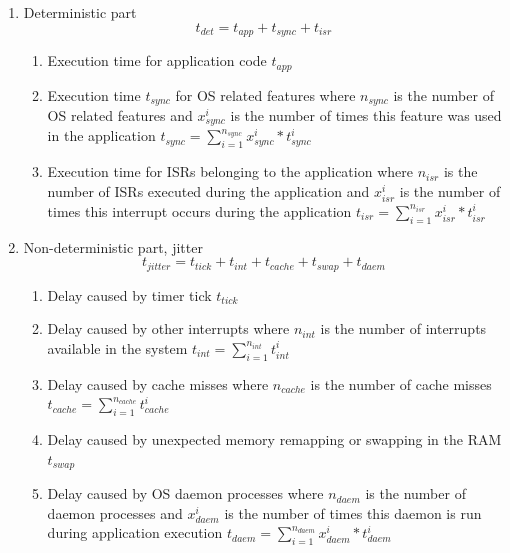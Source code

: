 \begin{enumerate}
	\item Deterministic part 
	\begin{equation}
			t_{det} = t_{app} + t_{sync} + t_{isr}
		\label{eq_det_app}
	\end{equation}  		
		\begin{enumerate}
			\item Execution time for application code $ t_{app} $ 
			\item Execution time $ t_{sync} $ for \ac{OS} related features where $ n_{sync} $ is the number of \ac{OS} related features and $ x_{sync}^{i} $ is the number of times this feature was used in the application 
						$ t_{sync} = \sum\limits_{i=1}^{n_{sync}} {x_{sync}^{i} * t_{sync}^{i}} $
			\item Execution time for \acp{ISR} belonging to the application where $ n_{isr} $ is the number of 
						\acp{ISR} executed during the application and $ x_{isr}^{i} $ is the number of times this interrupt
						occurs during the application
						$ t_{isr} = \sum\limits_{i=1}^{n_{isr}} {x_{isr}^{i} * t_{isr}^{i}} $						
		\end{enumerate}	
  \item Non-deterministic part, jitter 
  \begin{equation}
   t_{jitter} = t_{tick} + t_{int} + t_{cache} + t_{swap} + t_{daem} 		
   \label{eq_indet_app}
	\end{equation}
		\begin{enumerate}
			\item Delay caused by timer tick $ t_{tick} $
			\item Delay caused by other interrupts where $ n_{int} $ is the number of interrupts available in the system 
						$ t_{int} = \sum\limits_{i=1}^{n_{int}} {t_{int}^{i}} $
			\item Delay caused by cache misses where $ n_{cache} $ is the number of cache misses 
						$ t_{cache} =  \sum\limits_{i=1}^{n_{cache}} {t_{cache}^{i}}$
			\item Delay caused by unexpected memory remapping or swapping in the \ac{RAM} $ t_{swap} $  
			\item Delay caused by \ac{OS} daemon processes where $ n_{daem} $ is the number of daemon processes and
						$ x_{daem}^{i} $ is the number of times this daemon is run during application execution
						$ t_{daem} = \sum\limits_{i=1}^{n_{daem}} {x_{daem}^{i} * t_{daem}^{i}} $
		\end{enumerate}	
\end{enumerate}
 
